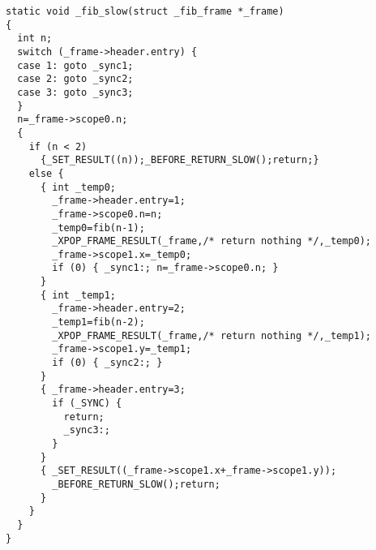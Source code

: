 \begin{verbatim}
static void _fib_slow(struct _fib_frame *_frame)
{
  int n;
  switch (_frame->header.entry) {
  case 1: goto _sync1;
  case 2: goto _sync2;
  case 3: goto _sync3;
  }
  n=_frame->scope0.n;
  {
    if (n < 2) 
      {_SET_RESULT((n));_BEFORE_RETURN_SLOW();return;}
    else {
      { int _temp0;
        _frame->header.entry=1;
        _frame->scope0.n=n;
        _temp0=fib(n-1);
        _XPOP_FRAME_RESULT(_frame,/* return nothing */,_temp0);
        _frame->scope1.x=_temp0;
        if (0) { _sync1:; n=_frame->scope0.n; }
      }
      { int _temp1;
        _frame->header.entry=2;
        _temp1=fib(n-2);
        _XPOP_FRAME_RESULT(_frame,/* return nothing */,_temp1);
        _frame->scope1.y=_temp1;
        if (0) { _sync2:; }
      }
      { _frame->header.entry=3;
        if (_SYNC) {
          return;
          _sync3:;
        }
      }
      { _SET_RESULT((_frame->scope1.x+_frame->scope1.y));
        _BEFORE_RETURN_SLOW();return;
      }
    }
  }
}
\end{verbatim}

